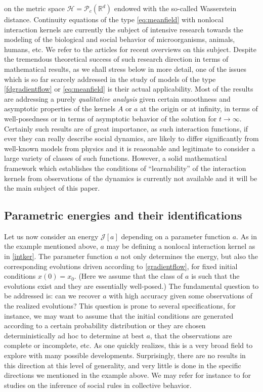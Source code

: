 on the metric space $\mathcal H =\mathcal P_c(\mathbb R^d)$ endowed with the so-called Wasserstein distance. Continuity equations of the type \eqref{eq:meanfield} with nonlocal interaction kernels are currently the subject of intensive research  towards the modeling of the biological and social behavior of microorganisms, animals, humans, etc. We refer to the  articles \cite{cafotove10,13-Carrillo-Choi-Hauray-MFL} for recent overviews on this subject. Despite the tremendous theoretical success of such research direction in terms of mathematical results, as we shall stress below in more detail, one of the issues which is so far scarcely addressed in the study of models of the type \eqref{fdgradientflow} or \eqref{eq:meanfield} is their actual applicability. Most of the results are addressing a purely {\it qualitative analysis} given certain smoothness and asymptotic properties of the kernels $A$ or $a$ at the origin or at infinity, in terms of well-posedness or in terms of asymptotic behavior of the solution for $t \to \infty$.  Certainly such results are of great importance, as such interaction functions, if ever they can really describe social dynamics,  are likely to differ significantly from well-known models from physics and it is reasonable and legitimate to consider a large variety of classes of such functions.
However, a solid mathematical framework which establishes the conditions of ``learnability'' of the interaction kernels from observations of the dynamics is currently not available and it will be the main subject of this paper.

\subsection{Parametric energies and their identifications}

Let us now consider an energy $\mathcal J[a]$ depending on a parameter function $a$. As in the example mentioned above, $a$ may be defining a nonlocal interaction kernel as in  \eqref{intker}. The parameter function $a$ not only determines the energy, but also the corresponding evolutions driven according to \eqref{gradientflow}, for fixed initial conditions $x(0)=x_0$. (Here we assume that the class of $a$ is such that the evolutions exist and they are essentially well-posed.)
The fundamental question to be addressed is: can we recover $a$ with high accuracy given some observations of the realized evolutions? This question is prone to several specifications, for instance, we may want to assume that the initial conditions are generated according to a certain probability distribution or they are chosen deterministically ad hoc to determine at best $a$, that the observations are complete or incomplete, etc. As one  quickly realizes, this is a very broad field to explore with many possible developments. Surprisingly, there are no results in this direction at this level of generality, and very little is done in the specific directions we mentioned in the example above. We may refer for instance to \cite{mann11,heoemascszwa11} for studies on the inference of social rules in collective behavior. 
